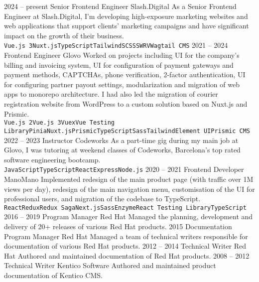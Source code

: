 \documentclass[9pt]{developercv}
\begin{document}

\begin{entrylist}
  \entry
  {2024 --  present}
  {Senior Frontend Engineer}
  {Slash.Digital}
  {As a Senior Frontend Engineer at Slash.Digital, I'm developing high-exposure marketing websites and web applications that support clients' marketing campaigns and have significant impact on the growth of their business.\\ \texttt{Vue.js 3}\slashsep\texttt{Nuxt.js}\slashsep\texttt{TypeScript}\slashsep\texttt{Tailwind}\slashsep\texttt{SCSS}\slashsep\texttt{SWRV}\slashsep\texttt{Wagtail CMS}}
  \entry
  {2021 --  2024}
  {Frontend Engineer}
  {Glovo}
  {Worked on projects including UI for the company's billing and invoicing system, UI for configuration of payment gateways and payment methods, CAPTCHAs, phone verification, 2-factor authentication, UI for configuring partner payout settings, modularization and migration of web apps to monorepo architecture. I had also led the migration of courier registration website from WordPress to a custom solution based on Nuxt.js and Prismic.\\ \texttt{Vue.js 2}\slashsep\texttt{Vue.js 3}\slashsep\texttt{Vuex}\slashsep\texttt{Vue Testing Library}\slashsep\texttt{Pinia}\slashsep\texttt{Nuxt.js}\slashsep\texttt{Prismic}\slashsep\texttt{TypeScript}\slashsep\texttt{Sass}\slashsep\texttt{Tailwind}\slashsep\texttt{Element UI}\slashsep\texttt{Prismic CMS}}
  \entry
  {2022 --  2023}
  {Instructor}
  {Codeworks}
  {As a part-time gig during my main job at Glovo, I was tutoring at weekend classes of Codeworks, Barcelona’s top rated software engineering bootcamp.\\ \texttt{JavaScript}\slashsep\texttt{TypeScript}\slashsep\texttt{React}\slashsep\texttt{Express}\slashsep\texttt{Node.js}}
  \entry
  {2020 -- 2021}
  {Frontend Developer}
  {ManoMano}
  {Implemented redesign of the main product page (with traffic over 1M views per day), redesign of the main navigation menu, customisation of the UI for professional users, and migration of the codebase to TypeScript.\\ \texttt{React}\slashsep\texttt{Redux}\slashsep\texttt{Redux Saga}\slashsep\texttt{Next.js}\slashsep\texttt{Sass}\slashsep\texttt{Enzyme}\slashsep\texttt{React Testing Library}\slashsep\texttt{TypeScript}}
  \entry
  {2016 -- 2019}
  {Program Manager}
  {Red Hat}
  {Managed the planning, development and delivery of 20+ releases of various Red Hat products. }
  \entry
  {2015}
  {Documentation Program Manager}
  {Red Hat}
  {Managed a team of technical writers responsible for documentation of various Red Hat products. }
  \entry
  {2012 -- 2014}
  {Technical Writer}
  {Red Hat}
  {Authored and maintained documentation of Red Hat products. }
  \entry
  {2008 -- 2012}
  {Technical Writer}
  {Kentico Software}
  {Authored and maintained product documentation of Kentico CMS. }
\end{entrylist}
\end{document}
